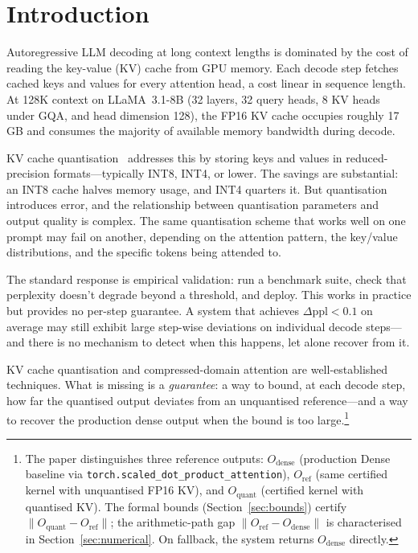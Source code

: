 \documentclass[10pt,twocolumn,a4paper]{article}
\theoremstyle{definition}
\theoremstyle{remark}
\newcommand{\norm}[1]{\lVert #1 \rVert}
\newcommand{\torchsdpa}{\texttt{torch.scaled\_\hspace{0pt}dot\_\hspace{0pt}product\_\hspace{0pt}attention}}
\begin{document}
\section{Introduction}
\label{sec:intro}

Autoregressive LLM decoding at long context lengths is dominated by the cost of reading the key-value (KV) cache from GPU memory.  Each decode step fetches cached keys and values for every attention head, a cost linear in sequence length.  At 128K context on LLaMA~3.1-8B (32 layers, 32 query heads, 8 KV heads under GQA, and head dimension 128), the FP16 KV cache occupies roughly 17\,GB and consumes the majority of available memory bandwidth during decode.

KV cache quantisation~\cite{kvquant,kivi,qjl,innerq} addresses this by storing keys and values in reduced-precision formats---typically INT8, INT4, or lower.  The savings are substantial: an INT8 cache halves memory usage, and INT4 quarters it.  But quantisation introduces error, and the relationship between quantisation parameters and output quality is complex.  The same quantisation scheme that works well on one prompt may fail on another, depending on the attention pattern, the key/value distributions, and the specific tokens being attended to.

The standard response is empirical validation: run a benchmark suite, check that perplexity doesn't degrade beyond a threshold, and deploy.  This works in practice but provides no per-step guarantee.  A system that achieves $\Delta\text{ppl} < 0.1$ on average may still exhibit large step-wise deviations on individual decode steps---and there is no mechanism to detect when this happens, let alone recover from it.

KV cache quantisation and compressed-domain attention are well-established techniques.  What is missing is a \emph{guarantee}: a way to bound, at each decode step, how far the quantised output deviates from an unquantised reference---and a way to recover the production dense output when the bound is too large.\footnote{The paper distinguishes three reference outputs: $O_{\mathrm{dense}}$ (production Dense baseline via \torchsdpa{}), $O_{\mathrm{ref}}$ (same certified kernel with unquantised FP16 KV), and $O_{\mathrm{quant}}$ (certified kernel with quantised KV).  The formal bounds (Section~\ref{sec:bounds}) certify $\norm{O_{\mathrm{quant}} - O_{\mathrm{ref}}}$; the arithmetic-path gap $\norm{O_{\mathrm{ref}} - O_{\mathrm{dense}}}$ is characterised in Section~\ref{sec:numerical}.  On fallback, the system returns $O_{\mathrm{dense}}$ directly.}
\end{document}

